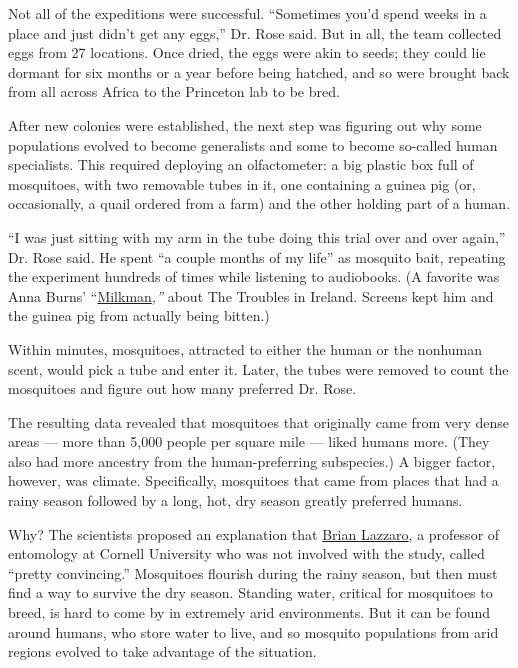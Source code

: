 Not all of the expeditions were successful. ``Sometimes you'd spend
weeks in a place and just didn't get any eggs,'' Dr. Rose said. But in
all, the team collected eggs from 27 locations. Once dried, the eggs
were akin to seeds; they could lie dormant for six months or a year
before being hatched, and so were brought back from all across Africa to
the Princeton lab to be bred.

After new colonies were established, the next step was figuring out why
some populations evolved to become generalists and some to become
so-called human specialists. This required deploying an olfactometer: a
big plastic box full of mosquitoes, with two removable tubes in it, one
containing a guinea pig (or, occasionally, a quail ordered from a farm)
and the other holding part of a human.

``I was just sitting with my arm in the tube doing this trial over and
over again,'' Dr. Rose said. He spent ``a couple months of my life'' as
mosquito bait, repeating the experiment hundreds of times while
listening to audiobooks. (A favorite was Anna Burns'
``\href{https://www.nytimes3xbfgragh.onion/2018/12/03/books/review-milkman-anna-burns-man-booker-prize-winner.html}{Milkman}\emph{,''}
about The Troubles in Ireland. Screens kept him and the guinea pig from
actually being bitten.)

Within minutes, mosquitoes, attracted to either the human or the
nonhuman scent, would pick a tube and enter it. Later, the tubes were
removed to count the mosquitoes and figure out how many preferred Dr.
Rose.

The resulting data revealed that mosquitoes that originally came from
very dense areas --- more than 5,000 people per square mile --- liked
humans more. (They also had more ancestry from the human-preferring
subspecies.) A bigger factor, however, was climate. Specifically,
mosquitoes that came from places that had a rainy season followed by a
long, hot, dry season greatly preferred humans.

Why? The scientists proposed an explanation that
\href{https://entomology.cals.cornell.edu/people/brian-lazzaro/}{Brian
Lazzaro}, a professor of entomology at Cornell University who was not
involved with the study, called ``pretty convincing.'' Mosquitoes
flourish during the rainy season, but then must find a way to survive
the dry season. Standing water, critical for mosquitoes to breed, is
hard to come by in extremely arid environments. But it can be found
around humans, who store water to live, and so mosquito populations from
arid regions evolved to take advantage of the situation.

